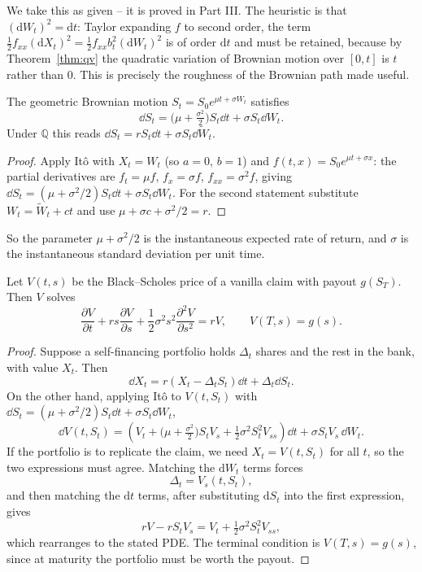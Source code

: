 \documentclass[a4paper]{scrartcl}
\newcommand{\QQ}{\mathbb{Q}}
\begin{document}
We take this as given -- it is proved in Part III. The heuristic is that $(\mathrm{d}W_t)^2 = \mathrm{d}t$: Taylor expanding $f$ to second order, the term $\tfrac12 f_{xx}(\mathrm{d}X_t)^2 = \tfrac12 f_{xx}b_t^2(\mathrm{d}W_t)^2$ is of order $\mathrm{d}t$ and must be retained, because by Theorem~\ref{thm:qv} the quadratic variation of Brownian motion over $[0,t]$ is $t$ rather than $0$. This is precisely the roughness of the Brownian path made useful.

\begin{proposition}
	The geometric Brownian motion $S_t = S_0e^{\mu t + \sigma W_t}$ satisfies
	$$
	\dd S_t = \Big(\mu + \tfrac{\sigma^2}{2}\Big)S_t\dd t + \sigma S_t\dd W_t.
	$$
	Under $\QQ$ this reads $\dd S_t = rS_t\dd t + \sigma S_t\dd \tilde W_t$.
\end{proposition}

\begin{proof}
	Apply It\^o with $X_t = W_t$ (so $a = 0$, $b=1$) and $f(t,x) = S_0e^{\mu t + \sigma x}$: the partial derivatives are $f_t = \mu f$, $f_x = \sigma f$, $f_{xx} = \sigma^2 f$, giving $\dd S_t = (\mu + \sigma^2/2)S_t\dd t + \sigma S_t\dd W_t$. For the second statement substitute $W_t = \tilde W_t + ct$ and use $\mu + \sigma c + \sigma^2/2 = r$.
\end{proof}

So the parameter $\mu + \sigma^2/2$ is the instantaneous expected rate of return, and $\sigma$ is the instantaneous standard deviation per unit time.

\begin{theorem}\label{thm:bs-pde}
	Let $V(t,s)$ be the Black--Scholes price of a vanilla claim with payout $g(S_T)$. Then $V$ solves
	$$
	\frac{\partial V}{\partial t} + rs\frac{\partial V}{\partial s} + \frac{1}{2}\sigma^2s^2\frac{\partial^2V}{\partial s^2} = rV, \qquad V(T,s) = g(s).
	$$
\end{theorem}

\begin{proof}
	Suppose a self-financing portfolio holds $\Delta_t$ shares and the rest in the bank, with value $X_t$. Then
	$$
	\dd X_t = r(X_t - \Delta_tS_t)\dd t + \Delta_t\dd S_t.
	$$
	On the other hand, applying It\^o to $V(t,S_t)$ with $\dd S_t = (\mu+\sigma^2/2)S_t\dd t + \sigma S_t\dd W_t$,
	$$
	\dd V(t,S_t) = \left(V_t + \big(\mu+\tfrac{\sigma^2}{2}\big)S_tV_s + \tfrac12\sigma^2S_t^2V_{ss}\right)\dd t + \sigma S_tV_s\,\dd W_t.
	$$
	If the portfolio is to replicate the claim, we need $X_t = V(t,S_t)$ for all $t$, so the two expressions must agree. Matching the $\mathrm{d}W_t$ terms forces
	$$
	\Delta_t = V_s(t,S_t),
	$$
	and then matching the $\mathrm{d}t$ terms, after substituting $\mathrm{d}S_t$ into the first expression, gives
	$$
	rV - rS_tV_s = V_t + \tfrac12\sigma^2S_t^2V_{ss},
	$$
	which rearranges to the stated PDE. The terminal condition is $V(T,s) = g(s)$, since at maturity the portfolio must be worth the payout.
\end{proof}
\end{document}
